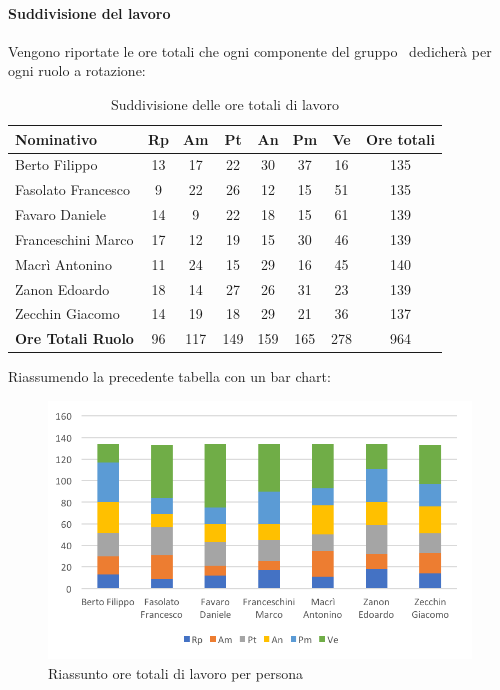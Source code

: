 \documentclass[../PianoDiProgetto_v3.0.0.tex]{subfiles}
\begin{document}
			\paragraph{Suddivisione del lavoro}
			Vengono riportate le ore totali che ogni componente del gruppo \kpanic\ dedicherà per ogni ruolo a rotazione:
			\begin{table}[h]
				\begin{tabularx}{\textwidth}{l * {6}{C} c}
				\toprule
				\textbf{Nominativo} & \textbf{Rp} & \textbf{Am} & \textbf{Pt} & \textbf{An} & \textbf{Pm} & \textbf{Ve} & \textbf{Ore totali} \\
				\midrule
				Berto Filippo &	13 & 17 & 22 & 30 & 37 & 16 & 135 \\
				Fasolato Francesco & 9 & 22 & 26 & 12 & 15 & 51 & 135 \\
				Favaro Daniele & 14 & 9 & 22 & 18 & 15 & 61 & 139 \\
				Franceschini Marco & 17 & 12 & 19 & 15 & 30 & 46 & 139 \\
				Macrì Antonino & 11 & 24 & 15 & 29 & 16 & 45 & 140 \\
				Zanon Edoardo &	18 & 14 & 27 & 26 & 31 & 23 & 139 \\
				Zecchin Giacomo & 14 & 19 & 18 & 29 & 21 & 36 & 137 \\
				\midrule			
				\textbf{Ore Totali Ruolo} & 96 & 117 & 149 & 159 & 165 & 278 & 964 \\
				\bottomrule
				\end{tabularx}
				\caption{Suddivisione delle ore totali di lavoro}		
			\end{table}

			Riassumendo la precedente tabella con un bar chart:
			\begin{figure}[!h]
				\centering
				\includegraphics[width=\textwidth]{Preventivo/Immagini/totale_oreRuoloPersona.png}
				\caption{Riassunto ore totali di lavoro per persona}
			\end{figure}	
			
\end{document}
